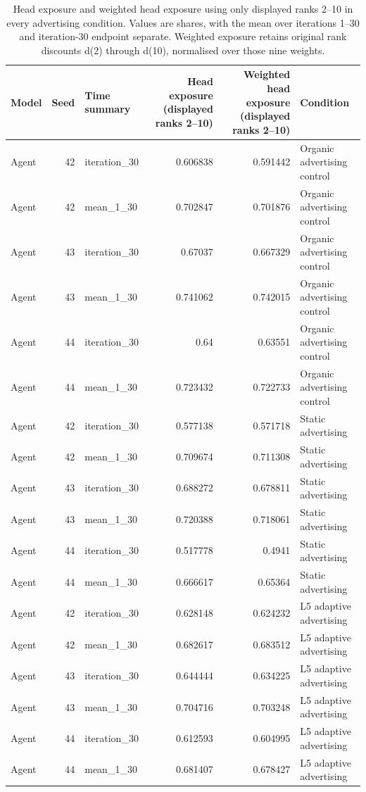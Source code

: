\begin{table}[htbp!]
\centering
\small
\setlength{\tabcolsep}{3pt}
\renewcommand{\arraystretch}{1.1}
\begin{tabular}{lrlrrl}
\hline
Model & Seed & Time summary & Head exposure (displayed ranks 2–10) & Weighted head exposure (displayed ranks 2–10) & Condition \\
\hline
Agent & 42 & iteration\_30 & 0.606838 & 0.591442 & Organic advertising control \\
Agent & 42 & mean\_1\_30 & 0.702847 & 0.701876 & Organic advertising control \\
Agent & 43 & iteration\_30 & 0.67037 & 0.667329 & Organic advertising control \\
Agent & 43 & mean\_1\_30 & 0.741062 & 0.742015 & Organic advertising control \\
Agent & 44 & iteration\_30 & 0.64 & 0.63551 & Organic advertising control \\
Agent & 44 & mean\_1\_30 & 0.723432 & 0.722733 & Organic advertising control \\
Agent & 42 & iteration\_30 & 0.577138 & 0.571718 & Static advertising \\
Agent & 42 & mean\_1\_30 & 0.709674 & 0.711308 & Static advertising \\
Agent & 43 & iteration\_30 & 0.688272 & 0.678811 & Static advertising \\
Agent & 43 & mean\_1\_30 & 0.720388 & 0.718061 & Static advertising \\
Agent & 44 & iteration\_30 & 0.517778 & 0.4941 & Static advertising \\
Agent & 44 & mean\_1\_30 & 0.666617 & 0.65364 & Static advertising \\
Agent & 42 & iteration\_30 & 0.628148 & 0.624232 & L5 adaptive advertising \\
Agent & 42 & mean\_1\_30 & 0.682617 & 0.683512 & L5 adaptive advertising \\
Agent & 43 & iteration\_30 & 0.644444 & 0.634225 & L5 adaptive advertising \\
Agent & 43 & mean\_1\_30 & 0.704716 & 0.703248 & L5 adaptive advertising \\
Agent & 44 & iteration\_30 & 0.612593 & 0.604995 & L5 adaptive advertising \\
Agent & 44 & mean\_1\_30 & 0.681407 & 0.678427 & L5 adaptive advertising \\
\hline
\end{tabular}
\caption{Head exposure and weighted head exposure using only displayed ranks 2--10 in every advertising condition. Values are shares, with the mean over iterations 1--30 and iteration-30 endpoint separate. Weighted exposure retains original rank discounts d(2) through d(10), normalised over those nine weights.}
\label{chap:results:tab:rq1_advertising_ranks_2_10_levels}
\end{table}
